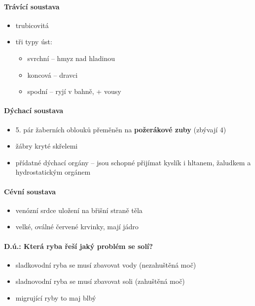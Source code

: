\paragraph{Trávící soustava}
\begin{itemize}
\item trubicovitá
\item tři typy úst: 
	\begin{itemize}
	\item svrchní -- hmyz nad hladinou
	\item koncová -- dravci
	\item spodní -- ryjí v bahně, + vousy
	\end{itemize}
\end{itemize}

\paragraph{Dýchací soustava}
\begin{itemize}
\item 5. pár žaberních oblouků přeměněn na \textbf{požerákové zuby} (\ra zbývají 4)
\item žábry kryté skřelemi
\item přídatné dýchací orgány -- jsou schopné přijímat kyslík i hltanem, žaludkem a hydrostatickým orgánem
\end{itemize}

\paragraph{Cévní soustava}
\begin{itemize}
\item venózní srdce uložení na břišní straně těla
\item velké, oválné červené krvinky, mají jádro
\end{itemize}

\paragraph{D.ú.: Která ryba řeší jaký problém se solí?}
\begin{itemize}
\item sladkovodní ryba se musí zbavovat vody (nezahuštěná moč)
\item sladnovodní ryba se musí zbavovat soli (zahuštěná moč)
\item migrující ryby to maj blbý
\end{itemize}

